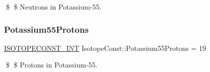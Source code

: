 \$ \$ Neutrons in Potassium-\/55. \mbox{\label{group___isotope_const-_potassium-_k55_gafe448caa9b75f77b5df25a3e3f2806bf}} 
\subsubsection{\texorpdfstring{Potassium55\+Protons}{Potassium55Protons}}
{\footnotesize\ttfamily \mbox{\hyperlink{group___isotope_const-_macros_ga5f18360b3e99483a35c32d789e62621c}{I\+S\+O\+T\+O\+P\+E\+C\+O\+N\+S\+T\+\_\+\+I\+NT}} Isotope\+Const\+::\+Potassium55\+Protons = 19}

\$ \$ Protons in Potassium-\/55. 